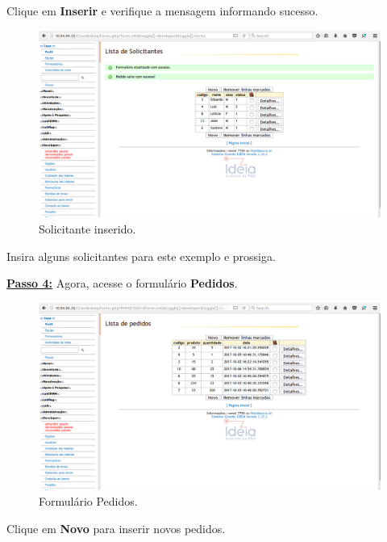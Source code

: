 \documentclass[9pt]{report}
\begin{document}
{       Clique em \textbf{Inserir} e verifique a mensagem informando
       sucesso.
       
       \begin{figure}[H]
        \includegraphics[width=\textwidth]{2_Formularios/4_Relacionamento_N_N/45.png}
        \caption{Solicitante inserido.}
        \label{fig:formssolictinsert}
       \end{figure}

       Insira alguns solicitantes para este exemplo e prossiga.

       
       \underline{\textbf{Passo 4:}} Agora, acesse o formulário \textbf{Pedidos}.
       
       \begin{figure}[H]
        \includegraphics[width=\textwidth]{2_Formularios/4_Relacionamento_N_N/46.png}
        \caption{Formulário Pedidos.}
        \label{fig:formspedido}
       \end{figure}

       Clique em \textbf{Novo} para inserir novos pedidos.

}
\end{document}
